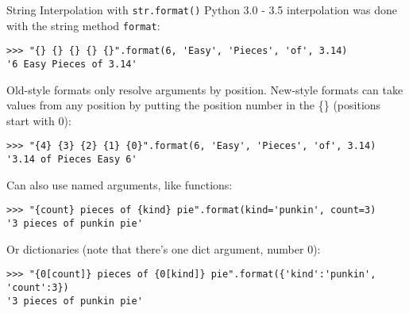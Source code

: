\documentclass[smaller, aspectratio=1610]{beamer}
\begin{document}
\begin{frame}[label={sec:org4e88f73},fragile]{String Interpolation with \texttt{str.format()}}
 Python 3.0 - 3.5 interpolation was done with the string method \texttt{format}:

\lstset{language=Python,label= ,caption= ,captionpos=b,numbers=none}
\begin{lstlisting}
>>> "{} {} {} {} {}".format(6, 'Easy', 'Pieces', 'of', 3.14)
'6 Easy Pieces of 3.14'
\end{lstlisting}

Old-style formats only resolve arguments by position. New-style
formats can take values from any position by putting the position
number in the \{\} (positions start with 0):

\lstset{language=Python,label= ,caption= ,captionpos=b,numbers=none}
\begin{lstlisting}
>>> "{4} {3} {2} {1} {0}".format(6, 'Easy', 'Pieces', 'of', 3.14)
'3.14 of Pieces Easy 6'
\end{lstlisting}

Can also use named arguments, like functions:

\lstset{language=Python,label= ,caption= ,captionpos=b,numbers=none}
\begin{lstlisting}
>>> "{count} pieces of {kind} pie".format(kind='punkin', count=3)
'3 pieces of punkin pie'
\end{lstlisting}

Or dictionaries (note that there's one dict argument, number 0):

\lstset{language=Python,label= ,caption= ,captionpos=b,numbers=none}
\begin{lstlisting}
>>> "{0[count]} pieces of {0[kind]} pie".format({'kind':'punkin',
'count':3})
'3 pieces of punkin pie'
\end{lstlisting}
\end{frame}
\end{document}
